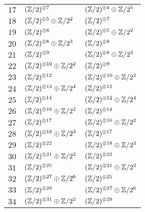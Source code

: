 \begin{supertabular}{|c|p{5.5cm}|p{5.5cm}|}
$17$%
&$(\mathbb{Z}/2)^{\oplus7}$%
&$(\mathbb{Z}/2)^{\oplus4}\oplus\mathbb{Z}/2^{5}$\\

$18$%
&$(\mathbb{Z}/2)^{\oplus5}\oplus\mathbb{Z}/2^{2}$%
&$(\mathbb{Z}/2)^{\oplus7}$\\

$19$%
&$(\mathbb{Z}/2)^{\oplus8}$%
&$(\mathbb{Z}/2)^{\oplus5}\oplus\mathbb{Z}/2^{2}$\\

$20$%
&$(\mathbb{Z}/2)^{\oplus8}\oplus\mathbb{Z}/2^{3}$%
&$(\mathbb{Z}/2)^{\oplus8}$\\

$21$%
&$(\mathbb{Z}/2)^{\oplus9}$%
&$(\mathbb{Z}/2)^{\oplus8}\oplus\mathbb{Z}/2^{3}$\\

$22$%
&$(\mathbb{Z}/2)^{\oplus10}\oplus\mathbb{Z}/2^{2}$%
&$(\mathbb{Z}/2)^{\oplus9}$\\

$23$%
&$(\mathbb{Z}/2)^{\oplus12}$%
&$(\mathbb{Z}/2)^{\oplus10}\oplus\mathbb{Z}/2^{2}$\\

$24$%
&$(\mathbb{Z}/2)^{\oplus12}\oplus\mathbb{Z}/2^{4}$%
&$(\mathbb{Z}/2)^{\oplus12}$\\

$25$%
&$(\mathbb{Z}/2)^{\oplus14}$%
&$(\mathbb{Z}/2)^{\oplus12}\oplus\mathbb{Z}/2^{4}$\\

$26$%
&$(\mathbb{Z}/2)^{\oplus16}\oplus\mathbb{Z}/2^{2}$%
&$(\mathbb{Z}/2)^{\oplus14}$\\

$27$%
&$(\mathbb{Z}/2)^{\oplus17}$%
&$(\mathbb{Z}/2)^{\oplus16}\oplus\mathbb{Z}/2^{2}$\\

$28$%
&$(\mathbb{Z}/2)^{\oplus18}\oplus\mathbb{Z}/2^{3}$%
&$(\mathbb{Z}/2)^{\oplus17}$\\

$29$%
&$(\mathbb{Z}/2)^{\oplus22}$%
&$(\mathbb{Z}/2)^{\oplus18}\oplus\mathbb{Z}/2^{3}$\\

$30$%
&$(\mathbb{Z}/2)^{\oplus21}\oplus\mathbb{Z}/2^{2}$%
&$(\mathbb{Z}/2)^{\oplus22}$\\

$31$%
&$(\mathbb{Z}/2)^{\oplus25}$%
&$(\mathbb{Z}/2)^{\oplus21}\oplus\mathbb{Z}/2^{2}$\\

$32$%
&$(\mathbb{Z}/2)^{\oplus27}\oplus\mathbb{Z}/2^{6}$%
&$(\mathbb{Z}/2)^{\oplus25}$\\

$33$%
&$(\mathbb{Z}/2)^{\oplus29}$%
&$(\mathbb{Z}/2)^{\oplus27}\oplus\mathbb{Z}/2^{6}$\\

$34$%
&$(\mathbb{Z}/2)^{\oplus31}\oplus\mathbb{Z}/2^{2}$%
&$(\mathbb{Z}/2)^{\oplus29}$\\


\end{supertabular}
